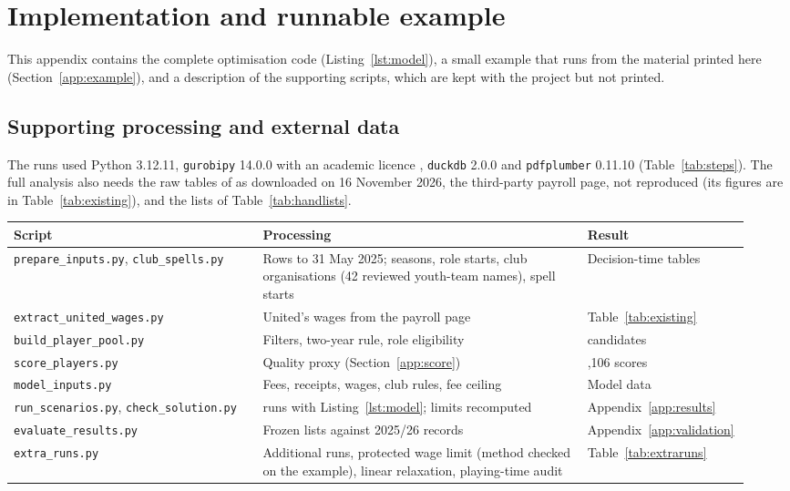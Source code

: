 \section{Implementation and runnable example}\label{app:code}

This appendix contains the complete optimisation code (Listing~\ref{lst:model}), a small example that runs from the material printed here (Section~\ref{app:example}), and a description of the supporting scripts, which are kept with the project but not printed.

\subsection{Supporting processing and external data}

The runs used Python 3.12.11, \texttt{gurobipy} 14.0.0 with an academic licence \citep{gurobi2026}, \texttt{duckdb} 2.0.0 and \texttt{pdfplumber} 0.11.10 (Table~\ref{tab:steps}). The full analysis also needs the raw tables of \citet{dcaribou2026} as downloaded on 16 November 2026, the third-party payroll page, not reproduced (its figures are in Table~\ref{tab:existing}), and the lists of Table~\ref{tab:handlists}.

\begin{apptable}
\label{tab:steps}
\begin{tabular}{@{}>{\raggedright\arraybackslash}p{0.33\linewidth} >{\raggedright\arraybackslash}p{0.43\linewidth} >{\raggedright\arraybackslash}p{0.18\linewidth}@{}}
\toprule
Script & Processing & Result \\
\midrule
\texttt{prepare\_inputs.py}, \texttt{club\_spells.py} & Rows to 31 May 2025; seasons, role starts, club organisations (42 reviewed youth-team names), spell starts & Decision-time tables \\
\texttt{extract\_united\_wages.py} & United's wages from the payroll page & Table~\ref{tab:existing} \\
\texttt{build\_player\_pool.py} & Filters, two-year rule, role eligibility & 806 candidates \\
\texttt{score\_players.py} & Quality proxy (Section~\ref{app:score}) & 1,106 scores \\
\texttt{model\_inputs.py} & Fees, receipts, wages, club rules, fee ceiling & Model data \\
\texttt{run\_scenarios.py}, \texttt{check\_solution.py} & 56 runs with Listing~\ref{lst:model}; limits recomputed & Appendix~\ref{app:results} \\
\texttt{evaluate\_results.py} & Frozen lists against 2025/26 records & Appendix~\ref{app:validation} \\
\texttt{extra\_runs.py} & Additional runs, protected wage limit (method checked on the example), linear relaxation, playing-time audit & Table~\ref{tab:extraruns} \\
\bottomrule
\end{tabular}
\end{apptable}

